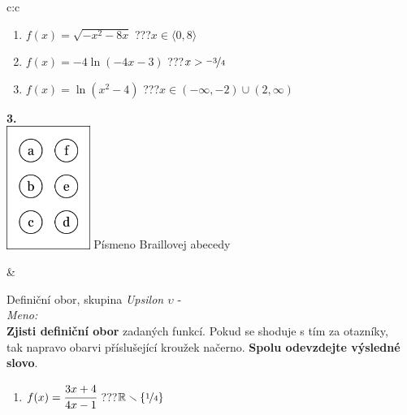 \documentclass[10pt]{report}
\begin{document}
\begin{tabular}{c:c}
\begin{minipage}[c][99mm][t]{0.49\linewidth}
\begin{center}
\begin{minipage}{0.77\linewidth}
\begin{center}
\begin{varwidth}{\textwidth}
\begin{enumerate}
\item $f(x)=\sqrt{-x^2-8x}$\quad \dotfill\; ???\;\dotfill \quad $x\in\langle0 , 8\rangle$
\item $f(x)=-4\ln{(-4x-3)}$\quad \dotfill\; ???\;\dotfill \quad $x>\nicefrac{-3}{4}$
\item $f(x)=\ln{(x^2-4)}$\quad \dotfill\; ???\;\dotfill \quad $x\in(-\infty , -2)\cup(2 , \infty)$
\end{enumerate}
\end{varwidth}
\end{center}
\end{minipage}
\begin{minipage}{0.20\linewidth}
\begin{center}
{\Huge\bfseries 3.} \\[2mm]
\includegraphics[height=40mm]{../images/braille.png}
{\small Písmeno Braillovej abecedy}
\end{center}
\end{minipage}
\end{center}
\end{minipage}
&
\begin{minipage}[c][99mm][t]{0.49\linewidth}
\begin{center}
\vspace{7mm}
{\huge Definiční obor, skupina \textit{Upsilon $\upsilon$} -}\\[4.5mm]
\textit{Meno:}\phantom{xxxxxxxxxxxxxxxxxxxxxxxxxxxxxxxxxxxxxxxxxxxxxxxxxxxxxxxxxxxxxxxxx}\\[3.5mm]
\textbf{Zjisti definiční obor} zadaných funkcí. Pokud se shoduje s tím za otazníky,\\tak napravo obarvi příslušející kroužek načerno. \textbf{Spolu odevzdejte výsledné slovo}.\\[3mm]
\begin{minipage}{0.77\linewidth}
\begin{center}
\begin{varwidth}{\textwidth}
\begin{enumerate}
\normalsize
\item $f(x)=\cfrac{3x+4}{4x-1}$\quad \dotfill\; ???\;\dotfill \quad $\mathbb{R}\smallsetminus\{\nicefrac{1}{4}\}$

\end{enumerate}
\end{varwidth}
\end{center}
\end{minipage}
\end{center}
\end{minipage}
\end{tabular}
\end{document}
